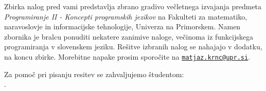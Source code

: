 \thispagestyle{empty}
\cleardoublepage
{}
\vspace*{3cm}
\begin{center}
Zbirka nalog pred vami
predstavlja zbrano gradivo  ve\v cletnega izvajanja 
predmeta \emph{Programiranje II - Koncepti programskih jezikov} na Fakulteti za matematiko, naravoslovje in informacijske tehnologije, Univerza na Primorskem. Namen zbornika je bralcu ponuditi nekatere zanimive naloge, ve\v cinoma iz funkcijskega programiranja v slovenskem jeziku. Re\v sitve izbranih nalog se nahajajo v dodatku, na koncu zbirke. Morebitne napake prosim sporo\v cite na
\href{mailto:matjaz.krnc@upr.si}{\texttt{matjaz.krnc@upr.si}}.\end{center}

\medskip

\begin{center}
    Za pomo\v c pri pisanju resitev se zahvaljujemo \v studentom: \\
		\myStudents.
\end{center}